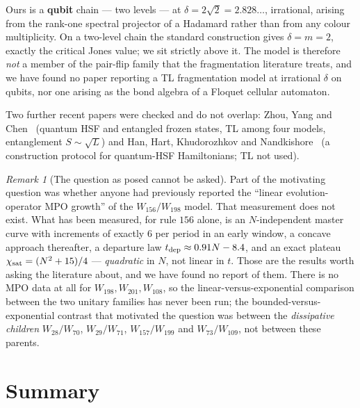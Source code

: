 \documentclass[11pt]{article}
\theoremstyle{plain}
\theoremstyle{remark}
\newtheorem{remark}{Remark}
\begin{document}
Ours is a \textbf{qubit} chain --- two levels --- at
$\delta = 2\sqrt2 = 2.828\ldots$, irrational, arising from the rank-one spectral
projector of a Hadamard rather than from any colour multiplicity. On a two-level
chain the standard construction gives $\delta = m = 2$, exactly the critical
Jones value; we sit strictly above it. The model is therefore \emph{not} a member
of the pair-flip family that the fragmentation literature treats, and we have
found no paper reporting a TL fragmentation model at irrational $\delta$ on
qubits, nor one arising as the bond algebra of a Floquet cellular automaton.

Two further recent papers were checked and do not overlap:
Zhou, Yang and Chen~\cite{Zhou2026} (quantum HSF and entangled frozen states,
TL among four models, entanglement $S\sim\sqrt L$) and Han, Hart, Khudorozhkov
and Nandkishore~\cite{Han2026} (a construction protocol for quantum-HSF
Hamiltonians; TL not used).

\begin{remark}[The question as posed cannot be asked]
Part of the motivating question was whether anyone had previously reported the
``linear evolution-operator MPO growth'' of the $W_{156}/W_{198}$ model. That
measurement does not exist. What has been measured, for rule $156$ alone, is an
$N$-independent master curve with increments of exactly $6$ per period in an
early window, a concave approach thereafter, a departure law
$t_{\rm dep} \approx 0.91N - 8.4$, and an exact plateau
$\chi_{\rm sat} = (N^2+15)/4$ --- \emph{quadratic} in $N$, not linear in $t$.
Those are the results worth asking the literature about, and we have found no
report of them. There is no MPO data at all for $W_{198}, W_{201}, W_{108}$, so
the linear-versus-exponential comparison between the two unitary families has
never been run; the bounded-versus-exponential contrast that motivated the
question was between the \emph{dissipative children} $W_{28}/W_{70}$,
$W_{29}/W_{71}$, $W_{157}/W_{199}$ and $W_{73}/W_{109}$, not between these
parents.
\end{remark}

\section{Summary}
\end{document}

